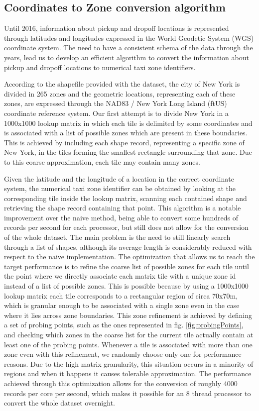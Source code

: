 \documentclass{acm_proc_article-sp-sigmod09}
\begin{document}
\subsection{Coordinates to Zone conversion algorithm}

Until 2016, information about pickup and dropoff locations is represented through latitudes and longitudes expressed in the World Geodetic System (WGS) coordinate system. The need to have a consistent schema of the data through the years, lead us to develop an efficient algorithm to convert the information about pickup and dropoff locations to numerical taxi zone identifiers. 

According to the shapefile provided with the dataset, the city of New York is divided in 265 zones and the geometric locations, representing each of these zones, are expressed through the NAD83 / New York Long Island (ftUS) coordinate reference system. Our first attempt is to divide New York in a 1000x1000 lookup matrix in which each tile is delimited by some coordinates and is associated with a list of possible zones which are present in these boundaries. This is achieved by including each shape record, representing a specific zone of New York, in the tiles forming the smallest rectangle surrounding that zone. Due to this coarse approximation, each tile may contain many zones.

Given the latitude and the longitude of a location in the correct coordinate system, the numerical taxi zone identifier can be obtained by looking at the corresponding tile inside the lookup matrix, scanning each contained shape and retrieving the shape record containing that point. This algorithm is a notable improvement over the naive method, being able to convert some hundreds of records per second for each processor, but still does not allow for the conversion of the whole dataset. The main problem is the need to still linearly search through a list of shapes, although its average length is considerably reduced with respect to the naive implementation. The optimization that allows us to reach the target performance is to refine the coarse list of possible zones for each tile until the point where we directly associate each matrix tile with a unique zone id instead of a list of possible zones. This is possible because by using a 1000x1000 lookup matrix each tile corresponds to a rectangular region of circa 70x70m, which is granular enough to be associated with a single zone even in the case where it lies across zone boundaries. This zone refinement is achieved by defining a set of probing points, such as the ones represented in fig. \ref{fig:probingPoints}, and checking which zones in the coarse list for the current tile actually contain at least one of the probing points. Whenever a tile is associated with more than one zone even with this refinement, we randomly choose only one for performance reasons. Due to the high matrix granularity, this situation occurs in a minority of regions and when it happens it causes tolerable approximation. The performance achieved through this optimization allows for the conversion of roughly 4000 records per core per second, which makes it possible for an 8 thread processor to convert the whole dataset overnight.
\end{document}
